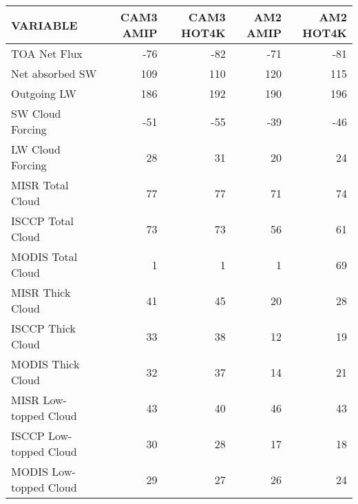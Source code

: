 \begin{tabular}{lrrrr}
\hline
                VARIABLE &                CAM3 AMIP &               CAM3 HOT4K &                 AM2 AMIP &                AM2 HOT4K \\ \hline
            TOA Net Flux &                      -76 &                      -82 &                      -71 &                      -81 \\
         Net absorbed SW &                      109 &                      110 &                      120 &                      115 \\
             Outgoing LW &                      186 &                      192 &                      190 &                      196 \\
        SW Cloud Forcing &                      -51 &                      -55 &                      -39 &                      -46 \\
        LW Cloud Forcing &                       28 &                       31 &                       20 &                       24 \\
        MISR Total Cloud &                       77 &                       77 &                       71 &                       74 \\
       ISCCP Total Cloud &                       73 &                       73 &                       56 &                       61 \\
       MODIS Total Cloud &                        1 &                        1 &                        1 &                       69 \\
        MISR Thick Cloud &                       41 &                       45 &                       20 &                       28 \\
       ISCCP Thick Cloud &                       33 &                       38 &                       12 &                       19 \\
       MODIS Thick Cloud &                       32 &                       37 &                       14 &                       21 \\
   MISR Low-topped Cloud &                       43 &                       40 &                       46 &                       43 \\
  ISCCP Low-topped Cloud &                       30 &                       28 &                       17 &                       18 \\
  MODIS Low-topped Cloud &                       29 &                       27 &                       26 &                       24 \\

\end{tabular}
